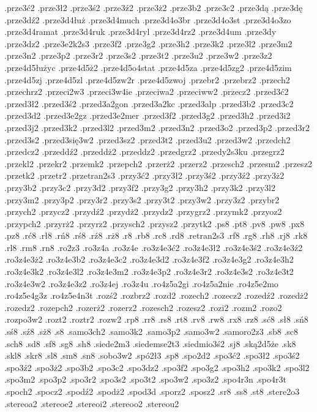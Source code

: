 {.prze3ć2
.prze3ł2
.prze3ś2
.prze3ź2
.prze3ż2
.prze3b2
.prze3c2
.prze3dą
.prze3dę
.prze3dź2
.prze3d4łuż
.prze3d4much
.prze3d4o3br
.prze3d4o3st
.prze3d4o3zo
.prze3d4ramat
.prze3d4ruk
.prze3d4ryl
.prze3d4rz2
.prze3d4um
.prze3dy
.prze3dz2
.prze3e2k2s3
.prze3f2
.prze3g2
.prze3h2
.prze3k2
.prze3l2
.prze3m2
.prze3n2
.prze3p2
.prze3r2
.prze3s2
.prze3t2
.prze3u2
.prze3w2
.prze3z2
.prze4d5łużyc
.prze4d5ż2
.prze4d5o4stat
.prze4d5za
.prze4d5zg2
.prze4d5zim
.prze4d5zj
.prze4d5zl
.prze4d5zw2r
.prze4d5zwoj
.przebr2
.przebrz2
.przech2
.przechrz2
.przeci2w3
.przeci3w4ie
.przeciwa2
.przeciww2
.przecz2
.przed3ć2
.przed3ł2
.przed3ś2
.przed3a2gon
.przed3a2kc
.przed3alp
.przed3b2
.przed3c2
.przed3d2
.przed3e2gz
.przed3e2mer
.przed3f2
.przed3g2
.przed3h2
.przed3i2
.przed3j2
.przed3k2
.przed3l2
.przed3m2
.przed3n2
.przed3o2
.przed3p2
.przed3r2
.przed3s2
.przed3się3w2
.przed3sz2
.przed3t2
.przed3u2
.przed3w2
.przedch2
.przedcz2
.przeddź2
.przeddż2
.przeddz2
.przedgrz2
.przedy2s3ku
.przegrz2
.przekl2
.przekr2
.przemk2
.przepch2
.przerż2
.przerz2
.przesch2
.przesm2
.przesz2
.przetk2
.przetr2
.przetran2s3
.przy3ć2
.przy3ł2
.przy3ś2
.przy3ź2
.przy3ż2
.przy3b2
.przy3c2
.przy3d2
.przy3f2
.przy3g2
.przy3h2
.przy3k2
.przy3l2
.przy3m2
.przy3p2
.przy3r2
.przy3s2
.przy3t2
.przy3w2
.przy3z2
.przybr2
.przych2
.przycz2
.przydź2
.przydż2
.przydz2
.przygrz2
.przymk2
.przyoz2
.przypch2
.przyrż2
.przyrz2
.przysch2
.przysz2
.przytk2
.ps8
.pt8
.pv8
.pw8
.px8
.pz8
.rć8
.rł8
.rń8
.rś8
.rź8
.rż8
.r8
.rb8
.rc8
.rd8
.retran2s3
.rf8
.rg8
.rh8
.rj8
.rk8
.rl8
.rm8
.rn8
.ro2z3
.ro3z4a
.ro3z4e
.ro3z4e3ć2
.ro3z4e3ł2
.ro3z4e3ś2
.ro3z4e3ź2
.ro3z4e3ż2
.ro3z4e3b2
.ro3z4e3c2
.ro3z4e3d2
.ro3z4e3f2
.ro3z4e3g2
.ro3z4e3h2
.ro3z4e3k2
.ro3z4e3l2
.ro3z4e3m2
.ro3z4e3p2
.ro3z4e3r2
.ro3z4e3s2
.ro3z4e3t2
.ro3z4e3w2
.ro3z4e3z2
.ro3z4ej
.ro3z4u
.ro4z5a2gi
.ro4z5a2nie
.ro4z5e2mo
.ro4z5e4g3z
.ro4z5e4n3t
.rozś2
.rozbrz2
.rozd2
.rozech2
.rozecz2
.rozedź2
.rozedż2
.rozedz2
.rozepch2
.rozerż2
.rozerz2
.rozesch2
.rozesz2
.rozi2
.rozm2
.rozo2
.rozpo3w2
.rozt2
.roztr2
.rozw2
.rp8
.rr8
.rs8
.rt8
.rv8
.rw8
.rx8
.rz8
.sć8
.sł8
.sń8
.sś8
.sź8
.sż8
.s8
.samo3ch2
.samo3k2
.samo3p2
.samo3w2
.samoro2z3
.sb8
.sc8
.sch8
.sd8
.sf8
.sg8
.sh8
.siede2m3
.siedemse2t3
.siedmio3ś2
.sj8
.ską2d5że
.sk8
.skl8
.skr8
.sl8
.sm8
.sn8
.sobo3w2
.spó2ł3
.sp8
.spo2d2
.spo3ć2
.spo3ł2
.spo3ś2
.spo3ź2
.spo3ż2
.spo3b2
.spo3c2
.spo3dz2
.spo3f2
.spo3g2
.spo3h2
.spo3k2
.spo3l2
.spo3m2
.spo3p2
.spo3r2
.spo3s2
.spo3t2
.spo3w2
.spo3z2
.spo4r3n
.spo4r3t
.spoch2
.spocz2
.spodź2
.spodż2
.spod3d
.sporz2
.sposz2
.sr8
.ss8
.st8
.stere2o3
.stereoa2
.stereoe2
.stereoi2
.stereoo2
.stereou2
}
